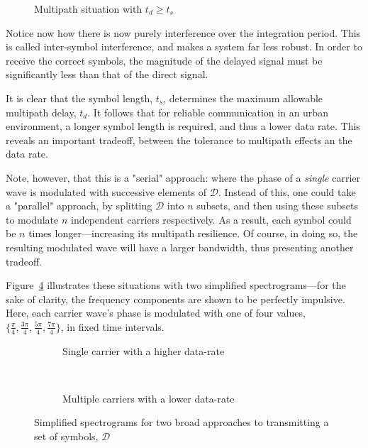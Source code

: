 \documentclass[class=report,11pt,crop=false]{standalone}
\begin{document}
\begin{figure}[htbp]
    \centering
    \captionsetup{type=figure}
    \def\svgwidth{\linewidth}
    { %
        }
    \caption{Multipath situation with \(t_d \ge t_s\)}
    \label{fig:multipath-symbol-morethan}
\end{figure}

Notice now how there is now purely interference over the integration period. This is called inter-symbol interference, and makes a system far less robust. In order to receive the correct symbols, the magnitude of the delayed signal must be significantly less than that of the direct signal.

It is clear that the symbol length, \(t_s\), determines the maximum allowable multipath delay, \(t_d\). It follows that for reliable communication in an urban environment, a longer symbol length is required, and thus a lower data rate. This reveals an important tradeoff, between the tolerance to multipath effects an the data rate.

Note, however, that this is a "serial" approach: where the phase of a \emph{single} carrier wave is modulated with successive elements of \(\mathcal{D}\). Instead of this, one could take a "parallel" approach, by splitting \(\mathcal{D}\) into \(n\) subsets, and then using these subsets to modulate \(n\) independent carriers respectively. As a result, each symbol could be \(n\) times longer---increasing its multipath resilience. Of course, in doing so, the resulting modulated wave will have a larger bandwidth, thus presenting another tradeoff.

Figure~\ref{fig:carrier-illustration} illustrates these situations with two simplified spectrograms---for the sake of clarity, the frequency components are shown to be perfectly impulsive. Here, each carrier wave's phase is modulated with one of four values, \(\big\{\frac{\pi}{4}, \frac{3\pi}{4}, \frac{5\pi}{4}, \frac{7\pi}{4}\big\}\), in fixed time intervals.

\begin{figure}[htbp]
    \centering
    \captionsetup{type=figure}
    \begin{subfigure}[t]{0.48\textwidth}
        \centering
        \def\svgwidth{0.9\linewidth}
        { %
            }
        \caption{Single carrier with a higher data-rate}
        \label{fig:serial-carrier}
    \end{subfigure}%
    ~ 
    \begin{subfigure}[t]{0.48\textwidth}
        \def\svgwidth{0.9\linewidth}
        { %
            }
        \caption{Multiple carriers with a lower data-rate}
        \label{fig:parallel-carrier}
    \end{subfigure}
    \caption{Simplified spectrograms for two broad approaches to transmitting a set of symbols, \(\mathcal{D}\)}
    \label{fig:carrier-illustration}
\end{figure}
\end{document}
